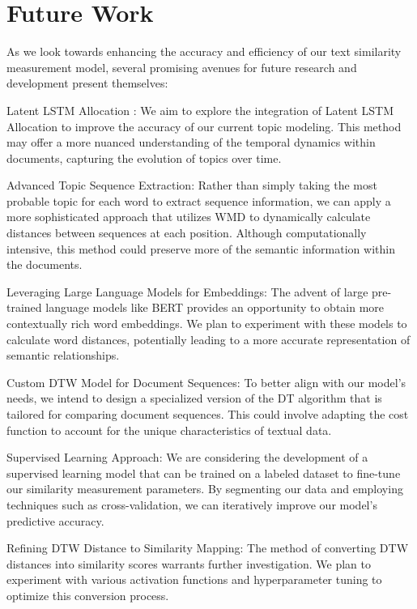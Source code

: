 \documentclass[UTF8]{ctexart}
\begin{document}
\section{Future Work}
{
    As we look towards enhancing the accuracy and efficiency of our text similarity measurement model, 
    several promising avenues for future research and development present themselves:

    Latent LSTM Allocation \cite{ref11}: We aim to explore the integration of Latent LSTM Allocation to 
    improve the accuracy of our current topic modeling. 
    This method may offer a more nuanced understanding of the temporal dynamics within documents, 
    capturing the evolution of topics over time.

    Advanced Topic Sequence Extraction: Rather than simply taking the most probable topic for each word to extract sequence information, 
    we can apply a more sophisticated approach that utilizes WMD to 
    dynamically calculate distances between sequences at each position. 
    Although computationally intensive, this method could preserve more of the semantic information within the documents.

    Leveraging Large Language Models for Embeddings: The advent of large pre-trained language models like 
    BERT provides an opportunity to obtain more contextually rich word embeddings. 
    We plan to experiment with these models to calculate word distances, 
    potentially leading to a more accurate representation of semantic relationships.

    Custom DTW Model for Document Sequences: To better align with our model's needs, 
    we intend to design a specialized version of the DT algorithm that is tailored for comparing document sequences. 
    This could involve adapting the cost function to account for the unique characteristics of textual data.

    Supervised Learning Approach: We are considering the development of a supervised learning model 
    that can be trained on a labeled dataset to fine-tune our similarity measurement parameters. 
    By segmenting our data and employing techniques such as cross-validation, 
    we can iteratively improve our model's predictive accuracy.

    Refining DTW Distance to Similarity Mapping: The method of converting DTW distances into similarity scores warrants further investigation.
    We plan to experiment with various activation functions and hyperparameter tuning to optimize this conversion process.

}
\end{document}

